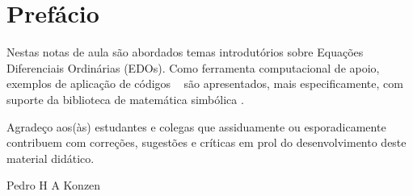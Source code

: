 
\chapter*{Prefácio}\label{prefacio}

\indent Nestas notas de aula são abordados temas introdutórios sobre Equações Diferenciais Ordinárias (EDOs). Como ferramenta computacional de apoio, exemplos de aplicação de códigos \python~ são apresentados, mais especificamente, com suporte da biblioteca de matemática simbólica \sympy.

\indent Agradeço aos(às) estudantes e colegas que assiduamente ou esporadicamente contribuem com correções, sugestões e críticas em prol do desenvolvimento deste material didático.

\begin{flushright}
  Pedro H A Konzen
\end{flushright}

